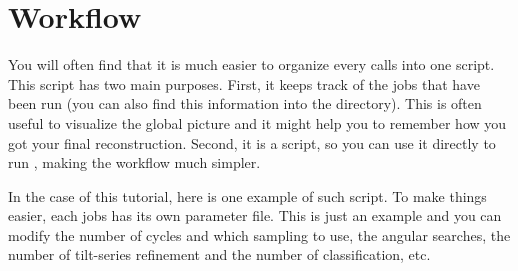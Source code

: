 \section{Workflow} \label{sec:workflow}



You will often find that it is much easier to organize every {\emClarity} calls into one script. This script has two main purposes. First, it keeps track of the jobs that have been run (you can also find this information into the  directory). This is often useful to visualize the global picture and it might help you to remember how you got your final reconstruction. Second, it is a script, so you can use it directly to run {\emClarity}, making the workflow much simpler.

In the case of this tutorial, here is one example of such script. To make things easier, each jobs has its own parameter file. This is just an example and you can modify the number of cycles and which sampling to use, the angular searches, the number of tilt-series refinement and the number of classification, etc.

